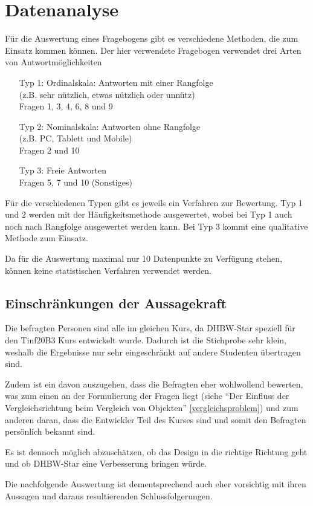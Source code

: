 \chapter{Datenanalyse}
Für die Auswertung eines Fragebogens gibt es verschiedene Methoden, die zum Einsatz kommen können. Der hier verwendete Fragebogen verwendet drei Arten von Antwortmöglichkeiten
\begin{itemize}
	\item[Typ 1:] {Ordinalskala: Antworten mit einer Rangfolge \\
		(z.B. sehr nützlich, etwas nützlich oder unnütz) \\
		Fragen 1, 3, 4, 6, 8 und 9}
	\item[Typ 2:] {Nominalskala: Antworten ohne Rangfolge \\
		(z.B. PC, Tablett und Mobile) \\
		Fragen 2 und 10}
	\item[Typ 3:] {Freie Antworten \\
		Fragen 5, 7 und 10 (Sonstiges) }
\end{itemize}
Für die verschiedenen Typen gibt es jeweils ein Verfahren zur Bewertung.
Typ 1 und 2 werden mit der Häufigkeitsmethode ausgewertet, wobei bei Typ 1 auch noch nach Rangfolge ausgewertet werden kann. Bei Typ 3 kommt eine qualitative Methode zum Einsatz.

Da für die Auswertung maximal nur 10 Datenpunkte zu Verfügung stehen, können keine statistischen Verfahren verwendet werden.
\newpage
\section{Einschränkungen der Aussagekraft }
Die befragten Personen sind alle im gleichen Kurs, da DHBW-Star speziell für den Tinf20B3 Kurs entwickelt wurde. Dadurch ist die Stichprobe sehr klein, weshalb die Ergebnisse nur sehr eingeschränkt auf andere Studenten übertragen sind.

Zudem ist ein davon auszugehen, dass die Befragten eher wohlwollend bewerten, was zum einen an der Formulierung der Fragen liegt (siehe "`Der Einfluss der Vergleichsrichtung beim Vergleich von Objekten"' \ref{vergleichsproblem}) und zum anderen daran, dass die Entwickler Teil des Kurses sind und somit den Befragten persönlich bekannt sind.

Es ist dennoch möglich abzuschätzen, ob das Design in die richtige Richtung geht und ob DHBW-Star eine Verbesserung bringen würde.

Die nachfolgende Auswertung ist dementsprechend auch eher vorsichtig mit ihren Aussagen und daraus resultierenden Schlussfolgerungen.


